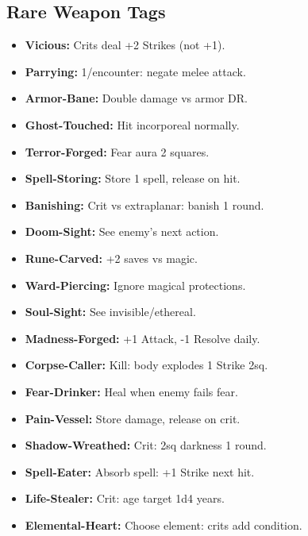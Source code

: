\documentclass[10pt,twoside]{article}
\begin{document}
\begin{multicols}{2}
\columnbreak

\subsection{Rare Weapon Tags}
\begin{itemize}[leftmargin=0.2cm, itemsep=0.02cm, parsep=0pt]
\item \textcolor{rarecolor}{\textbf{Vicious:}} Crits deal +2 Strikes (not +1).
\item \textcolor{rarecolor}{\textbf{Parrying:}} 1/encounter: negate melee attack.
\item \textcolor{rarecolor}{\textbf{Armor-Bane:}} Double damage vs armor DR.
\item \textcolor{rarecolor}{\textbf{Ghost-Touched:}} Hit incorporeal normally.
\item \textcolor{rarecolor}{\textbf{Terror-Forged:}} Fear aura 2 squares.
\item \textcolor{rarecolor}{\textbf{Spell-Storing:}} Store 1 spell, release on hit.
\item \textcolor{rarecolor}{\textbf{Banishing:}} Crit vs extraplanar: banish 1 round.
\item \textcolor{rarecolor}{\textbf{Doom-Sight:}} See enemy's next action.
\item \textcolor{rarecolor}{\textbf{Rune-Carved:}} +2 saves vs magic.
\item \textcolor{rarecolor}{\textbf{Ward-Piercing:}} Ignore magical protections.
\item \textcolor{rarecolor}{\textbf{Soul-Sight:}} See invisible/ethereal.
\item \textcolor{rarecolor}{\textbf{Madness-Forged:}} +1 Attack, -1 Resolve daily.
\item \textcolor{rarecolor}{\textbf{Corpse-Caller:}} Kill: body explodes 1 Strike 2sq.
\item \textcolor{rarecolor}{\textbf{Fear-Drinker:}} Heal when enemy fails fear.
\item \textcolor{rarecolor}{\textbf{Pain-Vessel:}} Store damage, release on crit.
\item \textcolor{rarecolor}{\textbf{Shadow-Wreathed:}} Crit: 2sq darkness 1 round.
\item \textcolor{rarecolor}{\textbf{Spell-Eater:}} Absorb spell: +1 Strike next hit.
\item \textcolor{rarecolor}{\textbf{Life-Stealer:}} Crit: age target 1d4 years.
\item \textcolor{rarecolor}{\textbf{Elemental-Heart:}} Choose element: crits add condition.

\end{itemize}
\end{multicols}
\end{document}
